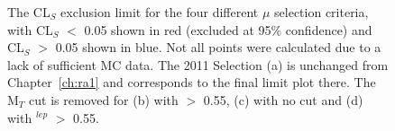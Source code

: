 \begin{figure}[htbp]
\centering
{}
\caption{\label{fig:4fit}The CL$_{S}$ exclusion limit for the four different $\mu$ selection criteria, with CL$_{S}$ $<$ 0.05 shown in red (excluded at 95\% confidence) and CL$_{S}$ $>$ 0.05 shown in blue. Not all points were calculated due to a lack of sufficient MC data. The 2011 Selection (a) is unchanged from Chapter~\ref{ch:ra1} and corresponds to the final limit plot there. The M$_{T}$ cut is removed for (b) with \alt $>$ 0.55, (c) with no \alt cut and (d) with \alt$^{lep}$ $>$ 0.55.}
\end{figure}



